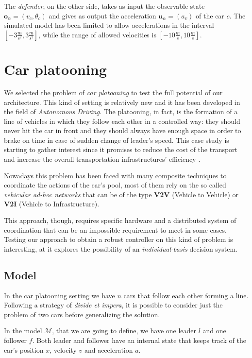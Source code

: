 The \textit{defender}, on the other side, takes as input the observable state $\textbf{o}_\alpha = (v_c, \theta_c)$ and gives as output the acceleration $\textbf{u}_\alpha = (a_v)$ of the car $c$.
The simulated model has been limited to allow accelerations in the interval $[-3 \frac{m}{s^2}, 3 \frac{m}{s^2}]$, while the range of allowed velocities is $[-10 \frac{m}{s}, 10 \frac{m}{s}]$.

\section{Car platooning}
We selected the problem of \textit{car platooning} \cite{carplatooning} to test the full potential of our architecture.
This kind of setting is relatively new and it has been developed in the field of \textit{Autonomous Driving}.
The platooning, in fact, is the formation of a line of vehicles in which they follow each other in a controlled way: they should never hit the car in front and they should always have enough space in order to brake on time in case of sudden change of leader's speed.
This case study is starting to gather interest since it promises to reduce the cost of the transport and increase the overall transportation infrastructures' efficiency \cite{platooning_survey}.

Nowadays this problem has been faced with many composite techniques \cite{platooning_survey} to coordinate the actions of the car's pool, most of them rely on the so called \textit{vehicular ad-hoc networks} that can be of the type \textbf{V2V} (Vehicle to Vehicle) or \textbf{V2I} (Vehicle to Infrastructure).

This approach, though, requires specific hardware and a distributed system of coordination that can be an impossible requirement to meet in some cases.
Testing our approach to obtain a robust controller on this kind of problem is interesting, at it explores the possibility of an \textit{individual-basis} decision system.

\subsection{Model}
In the car platooning setting we have $n$ cars that follow each other forming a line.
Following a strategy of \textit{divide et impera}, it is possible to consider just the problem of two cars before generalizing the solution.

In the model $\mathcal{M}$, that we are going to define, we have one leader $l$ and one follower $f$.
Both leader and follower have an internal state that keeps track of the car's position $x$, velocity $v$ and acceleration $a$. 

